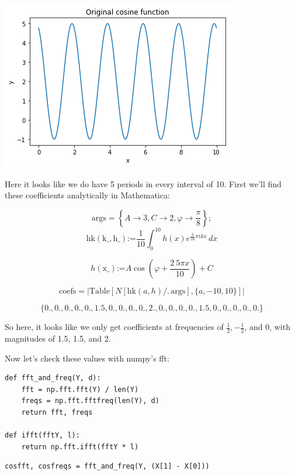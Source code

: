 \documentclass[11pt]{article}
\begin{document}
\includegraphics[width=.9\linewidth]{./obipy-resources/17087I4u.png}

Here it looks like we do have 5 periods in every interval of 10.
First we'll find these coefficients analytically in Mathematica: 

$$\text{args}=\left\{A\to 3,C\to 2,\varphi \to \frac{\pi }{8}\right\};$$
$$\text{hk}(\text{k$\_$},\text{h$\_$})\text{:=}\frac{1}{10} \int_0^{10} h(x)
e^{\frac{2}{10} \pi i k x} \, dx$$


$$h(\text{x$\_$})\text{:=}A \cos \left(\varphi +\frac{2\ 5 \pi  x}{10}\right)+C$$

$$\text{coefs}=\left| \text{Table}[N[\text{hk}(a,h)\text{/.}\,
\text{args}],\{a,-10,10\}]\right|$$

$$\{0.,0.,0.,0.,0.,1.5,0.,0.,0.,0.,2.,0.,0.,0.,0.,1.5,0.,0.,0.,0.,0.\}$$

So here, it looks like we only get coefficients at frequencies of $\frac{1}{2},
-\frac{1}{2}$, and $0$, with magnitudes of 1.5, 1.5, and 2.

Now let's check these values with numpy's fft:

\begin{verbatim}
def fft_and_freq(Y, d):
    fft = np.fft.fft(Y) / len(Y)
    freqs = np.fft.fftfreq(len(Y), d)
    return fft, freqs

def ifft(fftY, l):
    return np.fft.ifft(fftY * l)
\end{verbatim}


\begin{verbatim}
cosfft, cosfreqs = fft_and_freq(Y, (X[1] - X[0]))
\end{verbatim}
\end{document}
